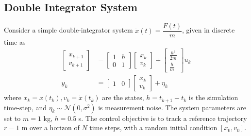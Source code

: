 \subsection{Double Integrator System}
Consider a simple double-integrator system $\ddot{x}(t) = \dfrac{F(t)}{m}$, given in discrete time as
\begin{equation}
\begin{split}
    \begin{bmatrix}
        x_{k+1} \\ v_{k+1}
    \end{bmatrix} &= \begin{bmatrix}
        1 & h \\ 0 &  1
    \end{bmatrix} \begin{bmatrix}
        x_k \\ v_k
    \end{bmatrix} + \begin{bmatrix}
        \frac{h^2}{2m} \\ \frac{h}{m}
    \end{bmatrix}u_k  \\
    y_k &= \begin{bmatrix}
        1 & 0
    \end{bmatrix} \begin{bmatrix}
        x_k \\ v_k
    \end{bmatrix} + \eta_k
\end{split}
\end{equation}
where $x_k = x(t_k), v_k = \dot{x}(t_k)$ are the states, $h = t_{k+1} - t_k$ is the simulation time-step, and $\eta_k \sim \mathcal{N}(0, \sigma^2)$ is measurement noise. The system parameters are set to $m = 1$ kg, $h = 0.5$ s. The control objective is to track a reference trajectory $r = 1$ m over a horizon of $N$ time steps, with a random initial condition $[x_0, v_0]$.

